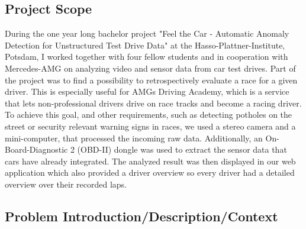 \subsection{Project Scope}
During the one year long bachelor project "Feel the Car - Automatic Anomaly Detection for Unstructured Test Drive Data" at the Hasso-Plattner-Institute, Potsdam, I worked together with four fellow students and in cooperation with Mercedes-AMG on analyzing video and sensor data from car test drives.
Part of the project was to find a possibility to retrospectively evaluate a race for a given driver. This is especially useful for AMGs Driving Academy, which is a service that lets non-professional drivers drive on race tracks and become a racing driver. To achieve this goal, and other requirements, such as detecting potholes on the street or security relevant warning signs in races, we used a stereo camera and a mini-computer, that processed the incoming raw data.
Additionally, an On-Board-Diagnostic 2 (OBD-II) dongle was used to extract the sensor data that cars have already integrated.
The analyzed result was then displayed in our web application which also provided a driver overview so every driver had a detailed overview over their recorded laps.

\subsection{Problem Introduction/Description/Context}

\clearpage